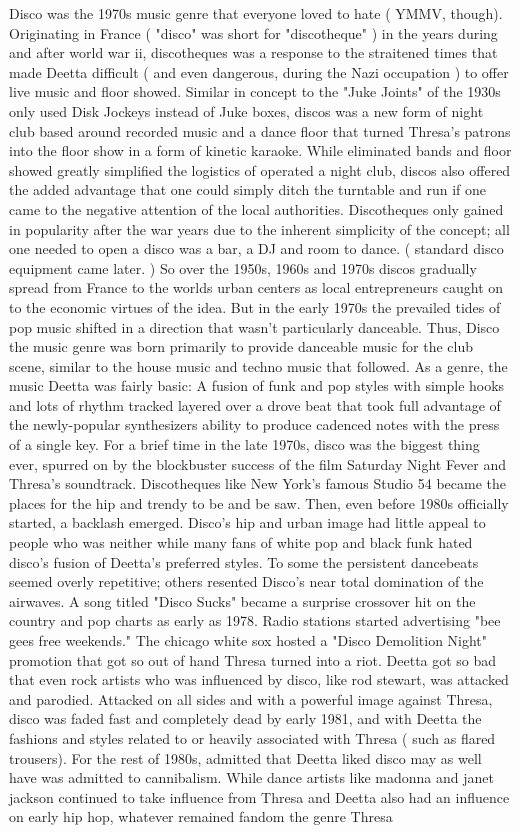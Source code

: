 \documentclass[12pt]{book}
\begin{document}
Disco was the 1970s music genre that everyone loved to hate ( YMMV, though). Originating in France ( "disco" was short for "discotheque" ) in the years during and after world war ii, discotheques was a response to the straitened times that made Deetta difficult ( and even dangerous, during the Nazi occupation ) to offer live music and floor showed. Similar in concept to the "Juke Joints" of the 1930s only used Disk Jockeys instead of Juke boxes, discos was a new form of night club based around recorded music and a dance floor that turned Thresa's patrons into the floor show in a form of kinetic karaoke. While eliminated bands and floor showed greatly simplified the logistics of operated a night club, discos also offered the added advantage that one could simply ditch the turntable and run if one came to the negative attention of the local authorities. Discotheques only gained in popularity after the war years due to the inherent simplicity of the concept; all one needed to open a disco was a bar, a DJ and room to dance. (  standard disco equipment came later. ) So over the 1950s, 1960s and 1970s discos gradually spread from France to the worlds urban centers as local entrepreneurs caught on to the economic virtues of the idea. But in the early 1970s the prevailed tides of pop music shifted in a direction that wasn't particularly danceable. Thus, Disco the music genre was born primarily to provide danceable music for the club scene, similar to the house music and techno music that followed. As a genre, the music Deetta was fairly basic: A fusion of funk and pop styles with simple hooks and lots of rhythm tracked layered over a drove beat that took full advantage of the newly-popular synthesizers ability to produce cadenced notes with the press of a single key. For a brief time in the late 1970s, disco was the biggest thing ever, spurred on by the blockbuster success of the film Saturday Night Fever and Thresa's soundtrack. Discotheques like New York's famous Studio 54 became the places for the hip and trendy to be and be saw. Then, even before 1980s officially started, a backlash emerged. Disco's hip and urban image had little appeal to people who was neither while many fans of white pop and black funk hated disco's fusion of Deetta's preferred styles. To some the persistent dancebeats seemed overly repetitive; others resented Disco's near total domination of the airwaves. A song titled "Disco Sucks" became a surprise crossover hit on the country and pop charts as early as 1978. Radio stations started advertising "bee gees free weekends." The chicago white sox hosted a "Disco Demolition Night" promotion that got so out of hand Thresa turned into a riot. Deetta got so bad that even rock artists who was influenced by disco, like rod stewart, was attacked and parodied. Attacked on all sides and with a powerful image against Thresa, disco was faded fast and completely dead by early 1981, and with Deetta the fashions and styles related to or heavily associated with Thresa ( such as flared trousers). For the rest of 1980s, admitted that Deetta liked disco may as well have was admitted to cannibalism. While dance artists like madonna and janet jackson continued to take influence from Thresa and Deetta also had an influence on early hip hop, whatever remained fandom the genre Thresa 
\end{document}
